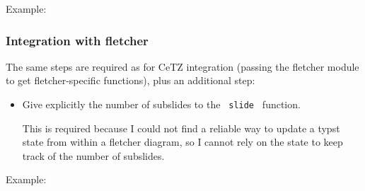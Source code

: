 Example:

\begin{Shaded}
\begin{Highlighting}[]


\NormalTok{\#slide[}

\NormalTok{    content((8,0), box(stroke: red+3pt, inset: 1em)[}
\NormalTok{    ])}
\NormalTok{  \})}
\NormalTok{]}
\end{Highlighting}
\end{Shaded}

\subsubsection{Integration with
fletcher}\label{integration-with-fletcher}

The same steps are required as for CeTZ integration (passing the
fletcher module to get fletcher-specific functions), plus an additional
step:

\begin{itemize}
\item
  Give explicitly the number of subslides to the \texttt{\ slide\ }
  function.

  This is required because I could not find a reliable way to update a
  typst state from within a fletcher diagram, so I cannot rely on the
  state to keep track of the number of subslides.
\end{itemize}

Example:

